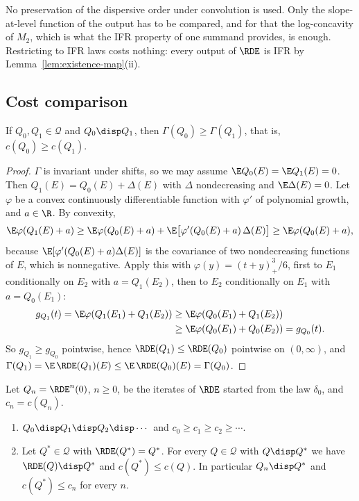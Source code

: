 \begin{remark}\label{rem:existence-mono}
No preservation of the dispersive order under convolution is used. Only the slope-at-level
function of the output has to be compared, and for that the log-concavity of $M_2$, which is
what the IFR property of one summand provides, is enough. Restricting to IFR laws costs
nothing: every output of $\RDE$ is IFR by Lemma~\ref{lem:existence-map}(ii).
\end{remark}

\subsection{Cost comparison}\label{subsec:existence-cost}

\begin{lemma}\label{lem:existence-cost}
If $Q_0,Q_1\in\mathcal{Q}$ and $Q_0\disp Q_1$, then $\Gamma(Q_0)\ge\Gamma(Q_1)$, that is,
$c(Q_0)\ge c(Q_1)$.
\end{lemma}

\begin{proof}
$\Gamma$ is invariant under shifts, so we may assume $\E Q_0(E)=\E Q_1(E)=0$. Then
$Q_1(E)=Q_0(E)+\Delta(E)$ with $\Delta$ nondecreasing and $\E\Delta(E)=0$. Let $\varphi$ be a
convex continuously differentiable function with $\varphi'$ of polynomial growth, and $a\in\R$.
By convexity,
\[
  \E\varphi(Q_1(E)+a)\ge\E\varphi(Q_0(E)+a)+\E\bigl[\varphi'(Q_0(E)+a)\,\Delta(E)\bigr]
  \ge\E\varphi(Q_0(E)+a),
\]
because $\E[\varphi'(Q_0(E)+a)\Delta(E)]$ is the covariance of two nondecreasing functions of
$E$, which is nonnegative. Apply this with $\varphi(y)=(t+y)_+^3/6$, first to $E_1$
conditionally on $E_2$ with $a=Q_1(E_2)$, then to $E_2$ conditionally on $E_1$ with
$a=Q_0(E_1)$:
\begin{align*}
  g_{Q_1}(t)=\E\varphi(Q_1(E_1)+Q_1(E_2))&\ge\E\varphi(Q_0(E_1)+Q_1(E_2))\\
  &\ge\E\varphi(Q_0(E_1)+Q_0(E_2))=g_{Q_0}(t).
\end{align*}
So $g_{Q_1}\ge g_{Q_0}$ pointwise, hence $\RDE(Q_1)\le\RDE(Q_0)$ pointwise on $(0,\infty)$, and
$\Gamma(Q_1)=\E\,\RDE(Q_1)(E)\le\E\,\RDE(Q_0)(E)=\Gamma(Q_0)$.
\end{proof}

\begin{corollary}\label{cor:existence-enclosure}
Let $Q_n=\RDE^n(0)$, $n\ge0$, be the iterates of $\RDE$ started from the law $\delta_0$, and
$c_n=c(Q_n)$.
\begin{enumerate}
\item[(i)] $Q_0\disp Q_1\disp Q_2\disp\cdots$ and $c_0\ge c_1\ge c_2\ge\cdots$.
\item[(ii)] Let $Q^*\in\mathcal{Q}$ with $\RDE(Q^*)=Q^*$. For every $Q\in\mathcal{Q}$ with
$Q\disp Q^*$ we have $\RDE(Q)\disp Q^*$ and $c(Q^*)\le c(Q)$. In particular $Q_n\disp Q^*$ and
$c(Q^*)\le c_n$ for every $n$.
\end{enumerate}
\end{corollary}

